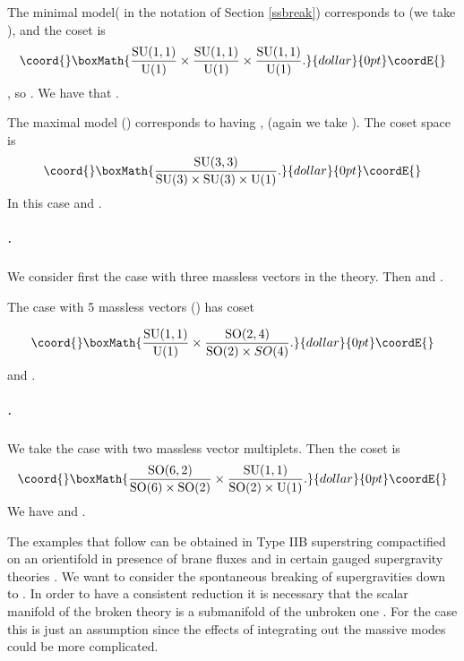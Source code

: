 \documentclass[a4paper,12pt]{article}
\begin{document}
The minimal model(\coordHE{} in the notation of
Section \ref{ssbreak}) corresponds to  \coordHE{} (we take \coordHE{}),
and  the coset is
$$\coord{}\boxMath{\frac{\rSU(1,1)}{\rU(1)}\times\frac{\rSU(1,1)}{\rU(1)}\times\frac{\rSU(1,1)}{\rU(1)}.
}{dollar}{0pt}\coordE{}$$\coordHE{}, so \coordHE{}. We have that  \coordHE{}.

The maximal model (\coordHE{}) corresponds to having \coordHE{}, (again we take \coordHE{}). The coset space is
$$\coord{}\boxMath{\frac{\rSU(3,3)}{\rSU(3)\times\rSU(3)\times\rU(1)}.}{dollar}{0pt}\coordE{}$$ In this case \coordHE{} and \coordHE{}.

\subparagraph{\coordHE{}.} We consider  first the case
with three massless vectors in the \coordHE{} theory. Then
\coordHE{} and \coordHE{}.

The case with 5 massless vectors (\coordHE{}) has coset

$$\coord{}\boxMath{\frac{\rSU(1,1)}{\rU(1)}\times\frac{\rSO(2,4)}{\rSO(2)\times SO(4)}.}{dollar}{0pt}\coordE{}$$  \coordHE{} and \coordHE{}.

\subparagraph{\coordHE{}.} We take the case with two massless vector multiplets. Then the coset is
$$\coord{}\boxMath{\frac{\rSO(6,2)}{\rSO(6)\times \rSO(2)}\times\frac{\rSU(1,1)}{\rSO(2)\times \rU(1)}.}{dollar}{0pt}\coordE{}$$
We have \coordHE{} and \coordHE{}.


\bigskip

The examples that follow can be obtained  in Type IIB superstring
 compactified on an orientifold \coordHE{} in presence of brane fluxes  \cite{fp,kst} and in certain
  gauged supergravity theories \cite{tz}.
We  want to consider the spontaneous breaking of \coordHE{}
supergravities down to \coordHE{}. In order to have a consistent
reduction it is necessary that  the scalar manifold of
 the broken theory is a submanifold of the unbroken one \cite{adf}. For the \coordHE{} case this is just
 an assumption since the effects of integrating out the massive modes could be more complicated.
\end{document}
